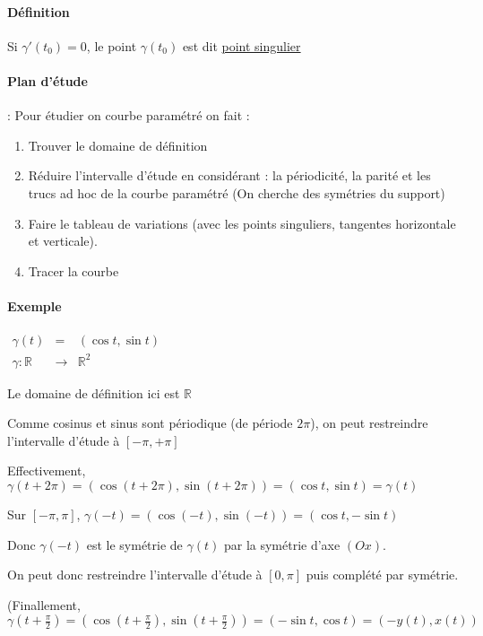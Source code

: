 \paragraph{Définition} Si $\gamma'(t_0) = 0$, le point $\gamma(t_0)$ est dit \ul{point singulier}

\paragraph{Plan d'étude} : Pour étudier on courbe paramétré on fait : 

\begin{enumerate}
	\item Trouver le domaine de définition
	\item Réduire l'intervalle d'étude en considérant : la périodicité, la parité et les trucs ad hoc de la courbe paramétré (On cherche des symétries du support)
	\item Faire le tableau de variations (avec les points singuliers, tangentes horizontale et verticale).
	\item Tracer la courbe
\end{enumerate}

\paragraph{Exemple}
	$\begin{array}{rcl}
		\gamma(t) &=& (\cos t, \sin t) \\
	\gamma : \mathbb{R} & \rightarrow & \mathbb{R}^2\end{array}$

		Le domaine de définition ici est $\mathbb{R}$

		Comme cosinus et sinus sont périodique (de période $2\pi$), on peut restreindre l'intervalle d'étude à $[-\pi, +\pi]$

		Effectivement, $\gamma(t + 2\pi) = (\cos(t+2\pi), \sin(t + 2\pi)) = (\cos t, \sin t) = \gamma (t)$

		Sur $[-\pi, \pi]$, $\gamma(-t) = (\cos (-t), \sin(-t)) = (\cos t, -\sin t)$

		Donc $\gamma(-t)$ est le symétrie de $\gamma(t)$ par la symétrie d'axe $(Ox)$.

		On peut donc restreindre l'intervalle d'étude à $[0, \pi]$ puis complété par symétrie.

		(Finallement, $\gamma(t + \frac{\pi}{2}) = (\cos(t+ \frac{\pi}{2}), \sin(t + \frac{\pi}{2})) = (-\sin t, \cos t) = (-y(t), x(t))$

